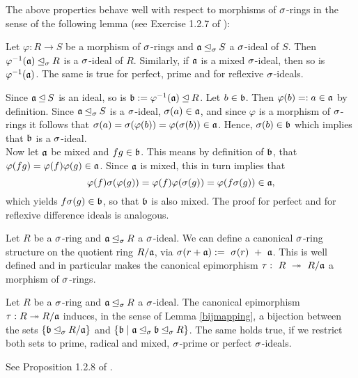 The above properties behave well with respect to morphisms of $\sigma$-rings in the sense of the following lemma (see Exercise 1.2.7 of \cite{wibmer}):
\begin{lem}\label{bijmapping}
Let $\varphi: R \rightarrow S$ be a morphism of $\sigma$-rings and $\mathfrak{a} \unlhd_{\sigma} S$ a $\sigma$-ideal of $S$. Then $\varphi^{-1}(\mathfrak{a}) \unlhd_{\sigma} R$ is a $\sigma$-ideal of $R$. Similarly, if $\mathfrak{a}$ is a mixed $\sigma$-ideal, then so is $\varphi^{-1}(\mathfrak{a})$. The same is true for perfect, prime and for reflexive $\sigma$-ideals.
\begin{bew}
Since $\mathfrak{a} \unlhd S$ is an ideal, so is $\mathfrak{b} := \varphi^{-1}(\mathfrak{a}) \unlhd R$. Let $b \in \mathfrak{b}$. Then $\varphi(b) =: a \in \mathfrak{a}$ by definition. Since $\mathfrak{a} \unlhd_{\sigma} S$ is a $\sigma$-ideal, $\sigma(a) \in \mathfrak{a}$, and since $\varphi$ is a morphism of $\sigma$-rings
it follows that $\sigma(a) = \sigma(\varphi(b)) = \varphi (\sigma (b)) \in \mathfrak{a}$. Hence, $\sigma(b) \in \mathfrak{b}$ which implies that $\mathfrak{b}$ is a $\sigma$-ideal. \\
\indent Now let $\mathfrak{a}$ be mixed and $fg \in \mathfrak{b}$. This means by definition of $\mathfrak{b}$, 
that $\varphi(fg) = \varphi(f) \varphi(g) \in \mathfrak{a}$. Since $\mathfrak{a}$ is mixed, this in turn implies that $$\varphi(f) \sigma( \varphi(g)) = \varphi(f) \varphi(\sigma(g)) = \varphi(f\sigma(g)) \in \mathfrak{a},$$ which yields $f\sigma(g) \in \mathfrak{b}$, so that $\mathfrak{b}$ is also mixed. 
The proof for perfect and for reflexive difference ideals is analogous.
\end{bew}
\end{lem}

\begin{rem}
Let $R$ be a $\sigma$-ring and $\mathfrak{a} \unlhd_{\sigma} R$ a $\sigma$-ideal. We can define a canonical $\sigma$-ring structure on the quotient ring $R/\mathfrak{a}$, via $\sigma(r+\mathfrak{a}):=~\sigma(r)~+~\mathfrak{a}$. 
This is well defined and in particular makes the canonical epimorphism $\tau:~R~\twoheadrightarrow~R/\mathfrak{a}$ a morphism of $\sigma$-rings.
\end{rem}

\begin{prop}\label{bijideals}
Let $R$ be a $\sigma$-ring and $\mathfrak{a} \unlhd_{\sigma} R$ a $\sigma$-ideal. The canonical epimorphism $\tau: R \twoheadrightarrow R/\mathfrak{a}$ induces, in the sense of Lemma \ref{bijmapping}, a bijection between the sets $\{ \mathfrak{b} \unlhd_{\sigma} R/\mathfrak{a} \}$ and $\{ \mathfrak{b} \mid \mathfrak{a} \unlhd_{\sigma} \mathfrak{b} \unlhd_{\sigma} R \}$. The same holds true, if we restrict both sets to prime, radical and mixed, $\sigma$-prime or perfect $\sigma$-ideals.
\begin{bew}
See Proposition 1.2.8 of \cite{wibmer}.
\end{bew}
\end{prop}

